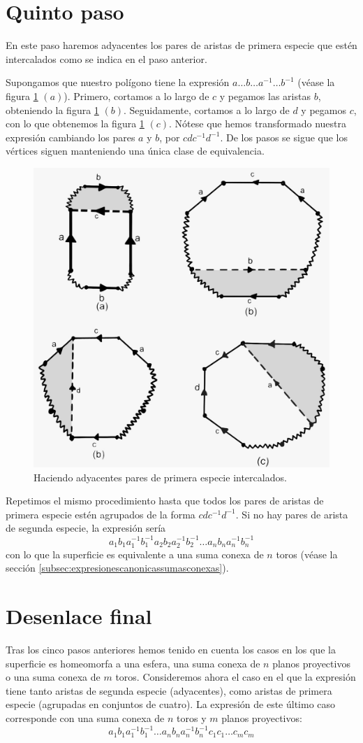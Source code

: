 \documentclass[a4paper,11pt,spanish, twoside, leqno]{tfg-uam}
\theoremstyle{definition}
\begin{document}
\section{Quinto paso}

En este paso haremos adyacentes los pares de aristas de primera especie que estén intercalados como se indica en el paso anterior.

Supongamos que nuestro polígono tiene la expresión $a \ldots b \ldots a^{-1} \ldots b^{-1}$ (véase la figura \ref{fig:paso5} $(a)$). Primero, cortamos a lo largo de $c$ y pegamos las aristas $b$, obteniendo la figura \ref{fig:paso5} $(b)$.  Seguidamente, cortamos a lo largo de $d$ y pegamos $c$, con lo que obtenemos la figura \ref{fig:paso5} $(c)$. Nótese que hemos transformado nuestra expresión cambiando los pares $a$ y $b$, por $cdc^{-1}d^{-1}$.  De los pasos se sigue que los vértices siguen manteniendo una única clase de equivalencia.

\begin{figure}[h!]
	\centering
	\includegraphics[width=0.4\linewidth]{imagenes/paso5.jpeg}
	\caption{Haciendo adyacentes pares de primera especie intercalados.}
	\label{fig:paso5}
\end{figure}

Repetimos el mismo procedimiento hasta que todos los pares de aristas de primera especie estén agrupados de la forma  $cdc^{-1}d^{-1}$. Si no hay pares de arista de segunda especie, la expresión sería 
\[a_1 b_1 a_1^{-1} b_1^{-1} a_2 b_2 a_2^{-1} b_2^{-1} \ldots a_n b_n a_n^{-1} b_n^{-1}\]
con lo que la superficie es equivalente a una suma conexa de $n$ toros (véase la sección \ref{subsec:expresionescanonicassumasconexas}).


\section{Desenlace final}
\label{sec:desenlacefinal}
Tras los cinco pasos anteriores hemos tenido en cuenta los casos en los que la superficie es homeomorfa a una esfera, una suma conexa de $n$ planos proyectivos o una suma conexa de $m$ toros. Consideremos ahora el caso en el que la expresión tiene tanto aristas de segunda especie (adyacentes), como aristas de primera especie (agrupadas en conjuntos de cuatro). La expresión de este último caso corresponde con una suma conexa de $n$ toros y $m$ planos proyectivos:
\[ a_1 b_1 a_1^{-1} b_1^{-1} \ldots a_n b_n a_n^{-1} b_n^{-1} c_1 c_1 \ldots c_m c_m \] 
\end{document}

